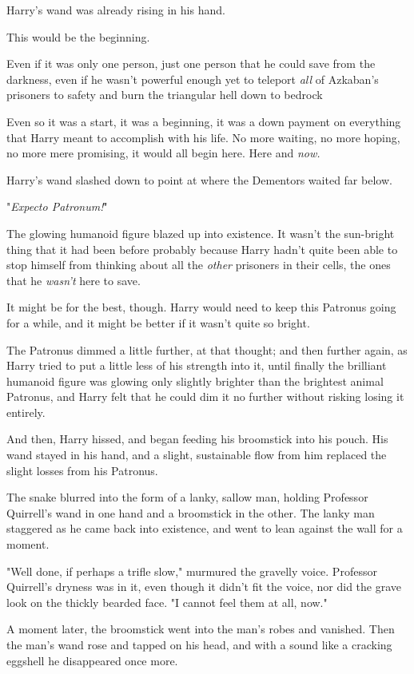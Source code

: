 Harry's wand was already rising in his hand.

This would be the beginning.

Even if it was only one person, just one person that he could save from the
darkness, even if he wasn't powerful enough yet to teleport \emph{all} of
Azkaban's prisoners to safety and burn the triangular hell down to
bedrock{\el}

Even so it was a start, it was a beginning, it was a down payment on everything
that Harry meant to accomplish with his life. No more waiting, no more hoping,
no more mere promising, it would all begin here. Here and \emph{now.}

Harry's wand slashed down to point at where the Dementors waited far below.

"\emph{Expecto Patronum!}"

The glowing humanoid figure blazed up into existence. It wasn't the sun-bright
thing that it had been before{\el} probably because Harry hadn't quite been
able to stop himself from thinking about all the \emph{other} prisoners in
their cells, the ones that he \emph{wasn't} here to save.

It might be for the best, though. Harry would need to keep this Patronus going
for a while, and it might be better if it wasn't quite so bright.

The Patronus dimmed a little further, at that thought; and then further again,
as Harry tried to put a little less of his strength into it, until finally the
brilliant humanoid figure was glowing only slightly brighter than the brightest
animal Patronus, and Harry felt that he could dim it no further without risking
losing it entirely.

And then,  Harry hissed, and began feeding his
broomstick into his pouch. His wand stayed in his hand, and a slight,
sustainable flow from him replaced the slight losses from his Patronus.

The snake blurred into the form of a lanky, sallow man, holding Professor
Quirrell's wand in one hand and a broomstick in the other. The lanky man
staggered as he came back into existence, and went to lean against the wall for
a moment.

"Well done, if perhaps a trifle slow," murmured the gravelly voice. Professor
Quirrell's dryness was in it, even though it didn't fit the voice, nor did the
grave look on the thickly bearded face. "I cannot feel them at all, now."

A moment later, the broomstick went into the man's robes and vanished. Then the
man's wand rose and tapped on his head, and with a sound like a cracking
eggshell he disappeared once more.

